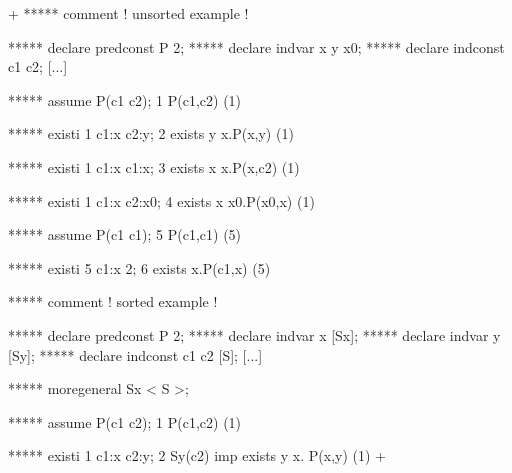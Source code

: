 \gfexample+
   *****  comment ! unsorted example !
       
   ***** declare predconst P 2;
   ***** declare indvar x y x0;
   ***** declare indconst c1 c2;
   [...]

   ***** assume P(c1 c2);
   1   P(c1,c2)     (1)

   ***** existi 1 c1:x c2:y;
   2   exists y x.P(x,y)     (1)

   ***** existi 1 c1:x c1:x;
   3   exists x x.P(x,c2)     (1)

   ***** existi 1 c1:x c2:x0;
   4   exists x x0.P(x0,x)     (1)

   ***** assume P(c1 c1);
   5   P(c1,c1)     (5)

   ***** existi 5 c1:x 2;
   6   exists x.P(c1,x)     (5)
    
    
   ***** comment ! sorted example !
    
   ***** declare predconst P 2;
   ***** declare indvar x [Sx];
   ***** declare indvar y [Sy];
   ***** declare indconst c1 c2 [S];
   [...]

   ***** moregeneral Sx < S >;

   ***** assume P(c1 c2);
   1   P(c1,c2)     (1)

   ***** existi 1 c1:x c2:y;
   2   Sy(c2) imp exists y x. P(x,y)     (1)
+
